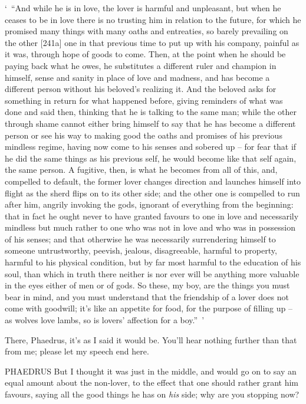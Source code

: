 ‘~“And while he is in love, the lover is harmful and unpleasant, but
when he ceases to be in love there is no trusting him in relation to the
future, for which he promised many things with  many oaths and
entreaties, so barely prevailing on the other {[}241a{]} one in that
previous time to put up with his company, painful as it was, through
hope of goods to come. Then, at the point when he should be paying back
what he owes, he substitutes a different ruler and champion in himself,
sense and sanity in place of love and madness, and has become a
different person without his beloved's realizing it. And the beloved
asks for  something in return for what happened
before, giving reminders
of what was done and said then, thinking that he is talking to the same
man; while the other through shame cannot either bring himself to say
that he has become a different person or see his way to making good the
oaths and promises of his previous mindless regime, having now come to
his senses and  sobered
up -- for fear that if he
did the same things as his previous self, he would become like that self
again, the same person. A fugitive, then, is what he becomes from all of
this,  and, compelled to default, the former lover changes
direction and launches himself into flight as the sherd flips on to its
other side; and the other
one is compelled to run after him, angrily invoking the gods, ignorant
of everything from the beginning: that in fact he ought never to have
granted favours to one in  love and
necessarily mindless but
much rather to one who was not in love and who was in possession of his
senses; and that otherwise he was necessarily surrendering himself to
someone untrustworthy, peevish, jealous, disagreeable, harmful to
property, harmful to his physical condition, but by far most harmful
 to the education of his soul, than which in truth there neither
is nor ever will be anything more valuable in the eyes either of men or
of gods. So these, my boy, are the things you must bear in mind, and you
must understand that the friendship of a lover does not come with
goodwill; it's like an appetite for food, for  the purpose of
filling up -- as wolves love lambs, so is lovers' affection for a
boy.”~'

There, Phaedrus, it's as I said it would
be. You'll hear nothing
further than that from me; please let my speech end here.

PHAEDRUS But I thought it was just in the middle, and would  go
on to say an equal amount about the non-lover, to the effect that one
should rather grant him favours, saying all the good things he has on
{\em his} side; why are you stopping now?

